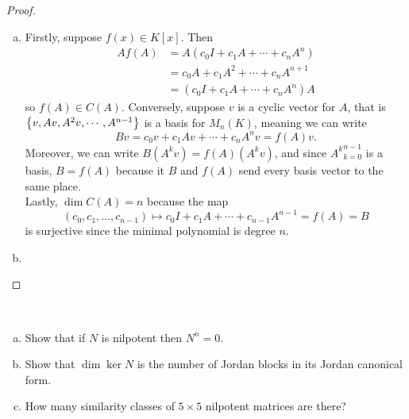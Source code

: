 \documentclass{article}
\begin{document}
\begin{proof}
\begin{enumerate}[(a)]
    \item Firstly, suppose $f(x) \in K[x]$. Then \begin{align*}
      Af(A) &= A(c_0I + c_1A + \cdots + c_nA^n) \\
        &= c_0A + c_1A^2 + \cdots + c_nA^{n+1} \\
        &= (c_0I + c_1A + \cdots + c_nA^n)A
    \end{align*} so $f(A) \in C(A)$.
    Conversely, suppose $v$ is a cyclic vector for $A$, that is
    $\left\{ v, Av, A^2v, \cdots, A^{n-1} \right\}$ is a basis for $M_n(K)$, meaning we can write \[
      Bv = c_0v + c_1Av + \cdots + c_nA^nv = f(A)v.
    \]
    Moreover, we can write $B(A^kv) = f(A)(A^kv)$, and since ${A^k}_{k=0}^{n-1}$
    is a basis, $B = f(A)$ because it $B$ and $f(A)$ send every basis vector to
    the same place.
    \\
    Lastly, $\dim C(A) = n$ because the map \[
      (c_0, c_1, \hdots, c_{n-1}) \mapsto c_0I + c_1A + \cdots + c_{n-1}A^{n-1} = f(A) = B
    \]
    is surjective since the minimal polynomial is degree $n$.
    \item
  \end{enumerate}
\end{proof}
\begin{problem}{3} ~
  \begin{enumerate}[(a)]
    \item Show that if $N$ is nilpotent then $N^n = 0$.
    \item Show that $\dim \ker N$ is the number of Jordan blocks in its Jordan canonical form.
    \item How many similarity classes of $5 \times 5$ nilpotent matrices are there?
  \end{enumerate}
\end{problem}
\end{document}
